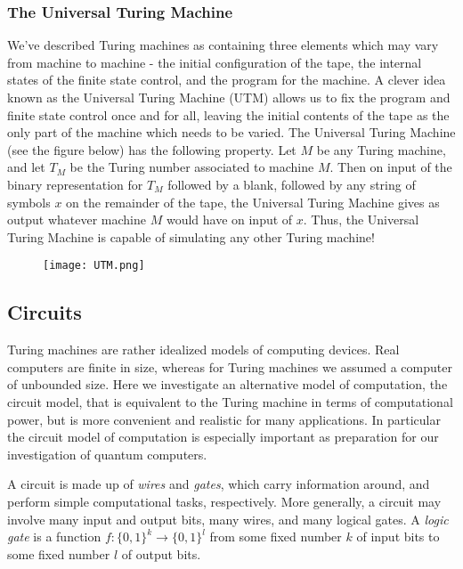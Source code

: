 \subsubsection*{The Universal Turing Machine}
We've described Turing machines as containing three elements which may vary from machine to machine - the initial configuration of the tape, the internal states of the finite state control, and the program for the machine. A clever idea known as the Universal Turing Machine (UTM) allows us to fix the program and finite state control once and for all, leaving the initial contents of the tape as the only part of the machine which needs to be varied.
The Universal Turing Machine (see the figure below) has the following property. Let $M$ be any Turing machine, and let $T_M$ be the Turing number associated to machine $M$. Then on input of the binary representation for $T_M$ followed by a blank, followed by any string of symbols $x$ on the remainder of the tape, the Universal Turing Machine gives as output whatever machine $M$ would have on input of $x$. Thus, the Universal Turing Machine is capable of simulating any other Turing machine!

\begin{figure}[h]
    \centering
    \texttt{[image: UTM.png]}
\end{figure}
\vspace{1em}

\subsection{Circuits}
Turing machines are rather idealized models of computing devices. Real computers are finite in size, whereas for Turing machines we assumed a computer of unbounded size. Here we investigate an alternative model of computation, the circuit model, that is equivalent to the Turing machine in terms of computational power, but is more convenient and realistic for many applications. In particular the circuit model of computation is especially important as preparation for our investigation of quantum computers.
\vspace{1em}

A circuit is made up of \textit{wires} and \textit{gates}, which carry information around, and perform simple computational tasks, respectively. More generally, a circuit may involve many input and output bits, many wires, and many logical gates. A \textit{logic gate} is a function $f : \{0,1\}^k \rightarrow \{0,1\}^l$ from some fixed number $k$ of input bits to some fixed number $l$ of output bits. 
\vspace{1em}

